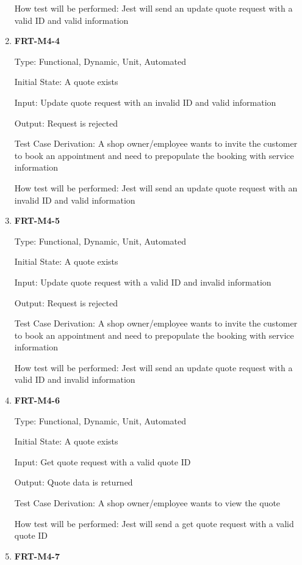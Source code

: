 \documentclass[12pt, titlepage]{article}
\begin{document}
\begin{enumerate}
	      How test will be performed: Jest will send an update quote request with a valid ID and valid
	      information

	\item \textbf{FRT-M4-4}

	      Type: Functional, Dynamic, Unit, Automated

	      Initial State: A quote exists

	      Input: Update quote request with an invalid ID and valid information

	      Output: Request is rejected

	      Test Case Derivation: A shop owner/employee wants to invite the customer to book an appointment and
	      need to prepopulate the booking with service information

	      How test will be performed: Jest will send an update quote request with an invalid ID and valid
	      information

	\item \textbf{FRT-M4-5}

	      Type: Functional, Dynamic, Unit, Automated

	      Initial State: A quote exists

	      Input: Update quote request with a valid ID and invalid information

	      Output: Request is rejected

	      Test Case Derivation: A shop owner/employee wants to invite the customer to book an appointment and
	      need to prepopulate the booking with service information

	      How test will be performed: Jest will send an update quote request with a valid ID and invalid
	      information

	\item \textbf{FRT-M4-6}

	      Type: Functional, Dynamic, Unit, Automated

	      Initial State: A quote exists

	      Input: Get quote request with a valid quote ID

	      Output: Quote data is returned

	      Test Case Derivation: A shop owner/employee wants to view the quote

	      How test will be performed: Jest will send a get quote request with a valid quote ID

	\item \textbf{FRT-M4-7}


\end{enumerate}
\end{document}
